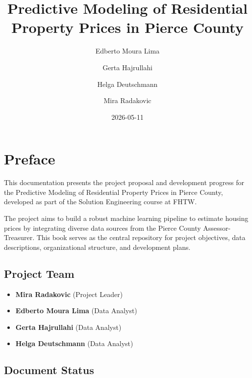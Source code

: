 \documentclass[
  english,
  letterpaper,
  DIV=11,
  numbers=noendperiod]{scrreprt}
\title{Predictive Modeling of Residential Property Prices in Pierce
County}
\author{Edberto Moura Lima \and Gerta Hajrullahi \and Helga
Deutschmann \and Mira Radakovic}
\date{2026-05-11}
\providecommand{\tightlist}{%
  \setlength{\itemsep}{0pt}\setlength{\parskip}{0pt}}
\renewcommand*\contentsname{Table of contents}
\newcommand\contentsname{Table of contents}
\begin{document}
\maketitle

\renewcommand*\contentsname{Table of contents}
{
\hypersetup{linkcolor=}
\setcounter{tocdepth}{2}
\tableofcontents
}


\chapter*{Preface}\label{preface}


This documentation presents the project proposal and development
progress for the Predictive Modeling of Residential Property Prices in
Pierce County, developed as part of the Solution Engineering course at
FHTW.

The project aims to build a robust machine learning pipeline to estimate
housing prices by integrating diverse data sources from the Pierce
County Assessor-Treasurer. This book serves as the central repository
for project objectives, data descriptions, organizational structure, and
development plans.

\section*{Project Team}\label{project-team}


\begin{itemize}
\tightlist
\item
  \textbf{Mira Radakovic} (Project Leader)
\item
  \textbf{Edberto Moura Lima} (Data Analyst)
\item
  \textbf{Gerta Hajrullahi} (Data Analyst)
\item
  \textbf{Helga Deutschmann} (Data Analyst)
\end{itemize}

\section*{Document Status}\label{document-status}

\end{document}
